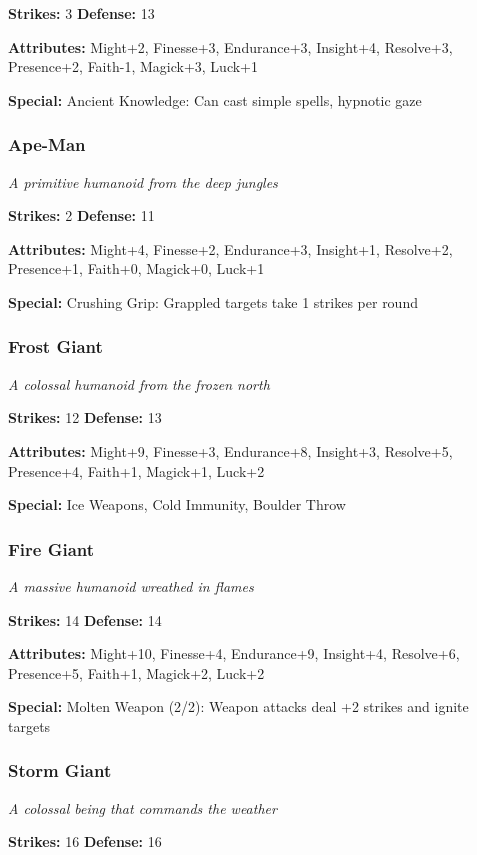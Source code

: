 \documentclass[10pt,twoside]{article}
\begin{document}
\textbf{Strikes:} 3 \quad \textbf{Defense:} 13

\textbf{Attributes:} Might+2, Finesse+3, Endurance+3, Insight+4, Resolve+3, Presence+2, Faith-1, Magick+3, Luck+1

\textbf{Special:} Ancient Knowledge: Can cast simple spells, hypnotic gaze

\subsubsection{Ape-Man}
\textit{A primitive humanoid from the deep jungles}

\textbf{Strikes:} 2 \quad \textbf{Defense:} 11

\textbf{Attributes:} Might+4, Finesse+2, Endurance+3, Insight+1, Resolve+2, Presence+1, Faith+0, Magick+0, Luck+1

\textbf{Special:} Crushing Grip: Grappled targets take 1 strikes per round

\subsubsection{Frost Giant}
\textit{A colossal humanoid from the frozen north}

\textbf{Strikes:} 12 \quad \textbf{Defense:} 13

\textbf{Attributes:} Might+9, Finesse+3, Endurance+8, Insight+3, Resolve+5, Presence+4, Faith+1, Magick+1, Luck+2

\textbf{Special:} Ice Weapons, Cold Immunity, Boulder Throw

\subsubsection{Fire Giant}
\textit{A massive humanoid wreathed in flames}

\textbf{Strikes:} 14 \quad \textbf{Defense:} 14

\textbf{Attributes:} Might+10, Finesse+4, Endurance+9, Insight+4, Resolve+6, Presence+5, Faith+1, Magick+2, Luck+2

\textbf{Special:} Molten Weapon (2/2): Weapon attacks deal +2 strikes and ignite targets

\subsubsection{Storm Giant}
\textit{A colossal being that commands the weather}

\textbf{Strikes:} 16 \quad \textbf{Defense:} 16
\end{document}
